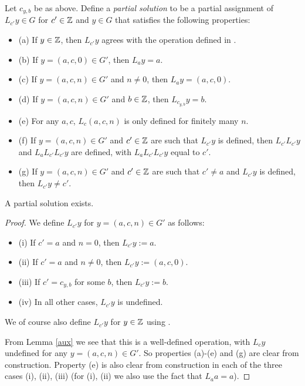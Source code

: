 Let $c_{y,b}$ be as above. Define a \emph{partial solution} to be a partial assignment of $L_{c'} y \in G$ for $c' \in \mathbb{Z}$ and $y \in G$ that satisfies the following properties:
\begin{itemize}
\item (a) If $y \in \mathbb{Z}$, then $L_{c'} y$ agrees with the operation defined in .
\item (b) If $y = (a,c,0) \in G'$, then $L_a y = a$.
\item (c) If $y = (a,c,n) \in G'$ and $n \neq 0$, then $L_a y = (a,c,0)$.
\item (d) If $y = (a,c,n) \in G'$ and $b \in \mathbb{Z}$, then $L_{c_{y,b}} y = b$.
\item (e) For any $a,c$, $L_c (a,c,n)$ is only defined for finitely many $n$.
\item (f) If $y = (a,c,n) \in G'$ and $c' \in \mathbb{Z}$ are such that $L_{c'} y$ is defined, then $L_{c'} L_{c'} y$ and $L_a L_{c'} L_{c'} y$ are defined, with $L_a L_{c'} L_{c'} y$ equal to $c'$.
\item (g) If $y = (a,c,n) \in G'$ and $c' \in \mathbb{Z}$ are such that $c' \neq a$ and $L_{c'} y$ is defined, then $L_{c'} y \neq c'$.
\end{itemize}

\begin{lemma}\label{part-exist}  A partial solution exists.
\end{lemma}

\begin{proof}  We define $L_{c'} y$ for $y = (a,c,n) \in G'$ as follows:
\begin{itemize}
  \item (i) If $c' = a$ and $n=0$, then $L_{c'} y := a$.
  \item (ii) If $c' = a$ and $n \neq 0$, then $L_{c'} y := (a,c,0)$.
  \item (iii) If $c' = c_{y,b}$ for some $b$, then $L_{c'} y := b$.
  \item (iv) In all other cases, $L_{c'} y$ is undefined.
\end{itemize}
We of course also define $L_{c'} y$ for $y \in \mathbb{Z}$ using .

From Lemma \ref{aux} we see that this is a well-defined operation, with $L_c y$ undefined for any $y = (a,c,n) \in G'$.  So properties (a)-(e) and (g) are clear from construction.  Property (e) is also clear from construction in each of the three cases (i), (ii), (iii) (for (i), (ii) we also use the fact that $L_a a = a$).
\end{proof}

